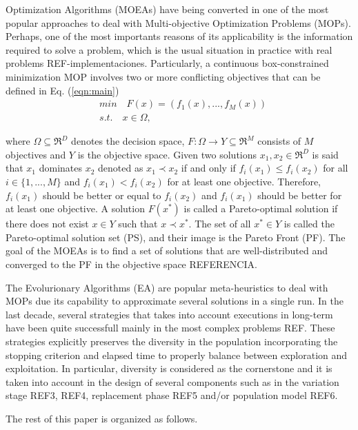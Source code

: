  Optimization Algorithms (MOEAs) have being converted in one of the most popular approaches to deal with Multi-objective Optimization Problems (MOPs).
%
Perhaps, one of the most importants reasons of its applicability is the information required to solve a problem, which is the usual situation in practice with real problems REF-implementaciones.
%
Particularly, a continuous box-constrained minimization MOP involves two or more conflicting objectives that can be defined in Eq. (\ref{eqn:main})
\begin{equation}\label{eqn:main}
\begin{split}
&min \quad F(x) = (f_1(x), ..., f_M(x)) \\
&s.t. \quad x \in \Omega,
\end{split}
\end{equation}

where $\Omega \subseteq \Re^D$ denotes the decision space, $F: \Omega \rightarrow Y \subseteq \Re^M$ consists of $M$ objectives and $Y$ is the objective space.
%
Given two solutions $x_1, x_2 \in \Re^D$ is said that $x_1$ dominates $x_2$ denoted as $x_1 \prec x_2$ if and only if $f_i(x_1) \leq f_i(x_2)$ for all $i \in \{1,...,M\}$ and $f_i(x_1) < f_i(x_2)$ for at least one objective.
%
Therefore, $f_i(x_1)$ should be better or equal to $f_i(x_2)$ and $f_i(x_1)$ should be better for at least one objective.
%
A solution $F(x^*)$ is called a Pareto-optimal solution if there does not exist $x \in Y$ such that $x \prec x^*$.
%
The set of all $x^* \in Y$ is called the Pareto-optimal solution set (PS), and their image is the Pareto Front (PF).
%
The goal of the MOEAs is to find a set of solutions that are well-distributed and converged to the PF in the objective space REFERENCIA.
%

The Evolurionary Algorithms (EA) are popular meta-heuristics to deal with MOPs due its capability to approximate several solutions in a single run.
%
In the last decade, several strategies that takes into account executions in long-term have been quite successfull mainly in the most complex problems REF.
%
These strategies explicitly preserves the diversity in the population incorporating the stopping criterion and elapsed time to properly balance between exploration and exploitation.
%
In particular, diversity is considered as the cornerstone and it is taken into account in the design of several components such as in the variation stage REF3, REF4, replacement phase REF5 and/or population model REF6.
%

%


The rest of this paper is organized as follows.

